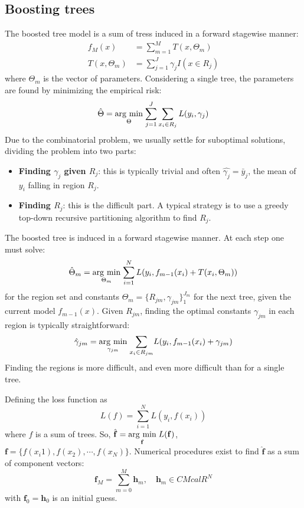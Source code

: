 \subsection{Boosting trees}
The boosted tree model is a sum of tress induced in a forward stagewise manner:
\begin{equation}
\begin{aligned}
f_M(x) &= \sum_{m=1}^M T(x, \Theta_m)\\
T(x, \Theta_m) &= \sum_{j=1}^J\gamma_j I(x \in R_j)
\end{aligned}
\end{equation}
where $\Theta_m$ is the vector of parameters. Considering a single tree, the parameters are found by minimizing the empirical risk:
\begin{equation}
\hat{\Theta} = \underset{\Theta}{\operatorname{arg}\,\operatorname{min}}\;{\sum_{j=1}^J\sum_{x_i \in R_j}L(y_i, \gamma_j)}
\end{equation}
Due to the combinatorial problem, we usually settle for suboptimal solutions, dividing the problem into two parts:
\begin{itemize}
\item \textbf{Finding $\gamma_j$ given $R_j$}: this is typically trivial and often $\hat{\gamma_j} = \bar{y}_j$, the mean of $y_i$ falling in region $R_j$.
\item \textbf{Finding $R_j$}: this is the difficult part. A typical strategy is to use a greedy top-down recursive partitioning  algorithm to find $R_j$.
\end{itemize}

The boosted tree is induced in a forward stagewise manner. At each step one must solve:
\begin{equation}
\hat{\Theta}_m = \argmin{\Theta_m}{\sum_{i=1}^N L\br{y_i, f_{m-1}(x_i)+T\br{x_i, \Theta_m}}}
\end{equation}
for the region set and constants $\Theta_m = \{R_{jm},\gamma_{jm}\}_1^{J_m}$ for the next tree, given the current model $f_{m-1}(x)$. Given $R_{jm}$, finding the optimal constants $\gamma_{jm}$ in each region is typically straightforward:
\begin{equation}
\hat{\gamma}_{jm} = \underset{\gamma_{jm}}{\operatorname{arg}\,\operatorname{min}}\;{\sum_{x_i \in R_{jm}}} L(y_i, f_{m-1}(x_i)+\gamma_{jm})
\end{equation}
Finding the regions is more difficult, and even more difficult than for a single tree.

Defining the loss function as
\begin{equation}
L(f) = \sum_{i=1}^N L(y_i, f(x_i))
\end{equation}
where $f$ is a sum of trees. So, $\hat{\mathbf{f}} =\underset{\mathbf{f}}{\operatorname{arg}\,\operatorname{min}}\;{L(\mathbf{f})}$, $\mathbf{f}=\{f(x_i1), f(x_2), \cdots, f(x_N)\}$. Numerical procedures exist to find $\hat{\mathbf{f}}$ as a sum of component vectors:
\begin{equation}
\mathbf{f}_M = \sum_{m=0}^M \mathbf{h}_m, \quad \mathbf{h}_m \in CMcal{R}^N
\end{equation}
with $\mathbf{f}_0=\mathbf{h}_0$ is an initial guess.

